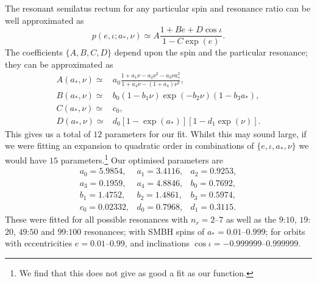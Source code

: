 \documentclass[aps,prd,amsfonts,amssymb,amsmath,nofootinbib,showpacs,superscriptaddress,twocolumn,floatfix]{revtex4-1}
\begin{document}
The resonant semilatus rectum for any particular spin and resonance ratio can be well approximated as
\begin{equation}
p(e,\iota;a_\ast,\nu) \simeq A\frac{1 + B e + D \cos\iota}{1 - C\exp(e)}.
\end{equation}
The coefficients $\{A,B,C,D\}$ depend upon the spin and the particular resonance; they can be approximated as
\begin{align} 
A(a_\ast,\nu) \simeq {} & a_0\frac{1 + a_1\nu - a_2 \nu^2 - a_3 \nu a_\ast^2}{1 + a_4\nu - (1 + a_4)\nu^2}, \\
B(a_\ast,\nu) \simeq {} & b_0(1 - b_1\nu)\exp(-b_2\nu)(1 - b_3 a_\ast), \\
C(a_\ast,\nu) \simeq {} & c_0, \\
D(a_\ast,\nu) \simeq {} & d_0\left[1 - \exp(a_\ast)\right]\left[1 - d_1\exp(\nu)\right].
\end{align}
This gives us a total of $12$ parameters for our fit. Whilst this may sound large, if we were fitting an expansion to quadratic order in combinations of $\{e,\iota,a_\ast,\nu\}$ we would have $15$ parameters.\footnote{We find that this does not give as good a fit as our function.} Our optimised parameters are
\begin{equation}
\begin{array}{lll}
a_0 = 5.9854, & a_1 = 3.4116, & a_2 = 0.9253,\\
a_3 = 0.1959, & a_4 = 4.8846, & b_0 = 0.7692,\\
b_1 = 1.4752, & b_2 = 1.4861, & b_3 = 0.5974,\\
c_0 = 0.02332, & d_0 = 0.7968, & d_1 = 0.3115.
\end{array}
\end{equation}
These were fitted for all possible resonances with $n_r = 2$--$7$ as well as the $9$:$10$, $19$:$20$, $49$:$50$ and $99$:$100$ resonances; with SMBH spins of $a_\ast = 0.01$--$0.999$; for orbits with eccentricities $e = 0.01$--$0.99$, and inclinations $\cos\iota = -0.999999$--$0.999999$. 
 
\end{document}
